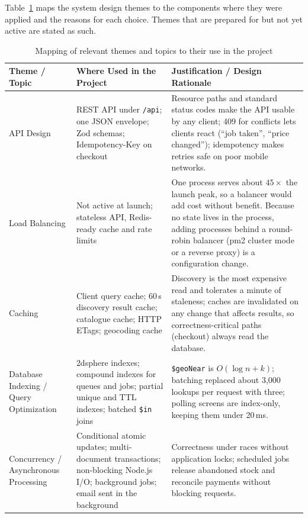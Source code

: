 \documentclass[manuscript,screen,review]{acmart}
\newcommand{\aiuse}{\textcolor{white}{AI used in this project: about 90\%.}}
\begin{document}
Table~\ref{tab:csd-themes} maps the system design themes to the components where they were applied and the reasons for each choice. Themes that are prepared for but not yet active are stated as such. \aiuse

\begin{table}[t]
  \caption{Mapping of relevant themes and topics to their use in the project}
  \label{tab:csd-themes}
  \footnotesize
  \setlength{\tabcolsep}{5pt}
  \renewcommand{\arraystretch}{1.25}

  \begin{tabularx}{\textwidth}{@{}
    p{}
    p{}
    X
    @{}}
    \toprule
    \textbf{Theme / Topic} &
    \textbf{Where Used in the Project} &
    \textbf{Justification / Design Rationale} \\
    \midrule

    API Design &
    REST API under \texttt{/api}; one JSON envelope; Zod schemas; Idempotency-Key on checkout &
    Resource paths and standard status codes make the API usable by any client; 409 for conflicts lets clients react (``job taken'', ``price changed''); idempotency makes retries safe on poor mobile networks. \\

    Load Balancing &
    Not active at launch; stateless API, Redis-ready cache and rate limits &
    One process serves about $45\times$ the launch peak, so a balancer would add cost without benefit. Because no state lives in the process, adding processes behind a round-robin balancer (pm2 cluster mode or a reverse proxy) is a configuration change. \\

    Caching &
    Client query cache; 60\,s discovery result cache; catalogue cache; HTTP ETags; geocoding cache &
    Discovery is the most expensive read and tolerates a minute of staleness; caches are invalidated on any change that affects results, so correctness-critical paths (checkout) always read the database. \\

    Database Indexing / Query Optimization &
    2dsphere indexes; compound indexes for queues and jobs; partial unique and TTL indexes; batched \texttt{\$in} joins &
    \texttt{\$geoNear} is $O(\log n + k)$; batching replaced about 3{,}000 lookups per request with three; polling screens are index-only, keeping them under 20\,ms. \\

    Concurrency / Asynchronous Processing &
    Conditional atomic updates; multi-document transactions; non-blocking Node.js I/O; background jobs; email sent in the background &
    Correctness under races without application locks; scheduled jobs release abandoned stock and reconcile payments without blocking requests. \\


\end{tabularx}
\end{table}
\end{document}
